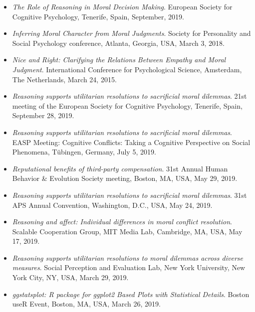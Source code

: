 \documentclass[10pt]{article}
\begin{document}
    \begin{itemize}
	\item \textit{The Role of Reasoning in Moral Decision Making}. European Society for Cognitive Psychology, Tenerife, Spain, September, 2019.
    
	
	\item \textit{Inferring Moral Character from Moral Judgments}. Society for Personality and Social Psychology conference, Atlanta, Georgia, USA, March 3, 2018.
	
	
	\item \textit{Nice and Right: Clarifying the Relations Between Empathy and Moral Judgment}. International Conference for Psychological Science, Amsterdam, The Netherlands, March 24, 2015.
	\item \textit{Reasoning supports utilitarian resolutions to sacrificial moral dilemmas}. 21st meeting of the European Society for Cognitive Psychology, Tenerife, Spain, September 28, 2019.
	

	\item \textit{Reasoning supports utilitarian resolutions to sacrificial moral dilemmas}. EASP Meeting: Cognitive Conflicts: Taking a Cognitive Perspective on Social Phenomena, Tübingen, Germany, July 5, 2019.
	

    \item \textit{Reputational benefits of third-party compensation}. 31st Annual Human Behavior \& Evolution Society meeting, Boston, MA, USA, May 29, 2019.
	

	\item \textit{Reasoning supports utilitarian resolutions to sacrificial moral dilemmas}. 31st APS Annual Convention, Washington, D.C., USA, May 24, 2019.
	

	\item \textit{Reasoning and affect: Individual differences in moral conflict resolution}. Scalable Cooperation Group, MIT Media Lab, Cambridge, MA, USA, May 17, 2019.
	

	\item \textit{Reasoning supports utilitarian resolutions to moral dilemmas across diverse measures}. Social Perception and Evaluation Lab, New York University, New York City, NY, USA, March 29, 2019.
	

	\item \textit{ggstatsplot: R package for ggplot2 Based Plots with Statistical Details}. Boston useR Event, Boston, MA, USA, March 26, 2019.
	


\end{itemize}
\end{document}
